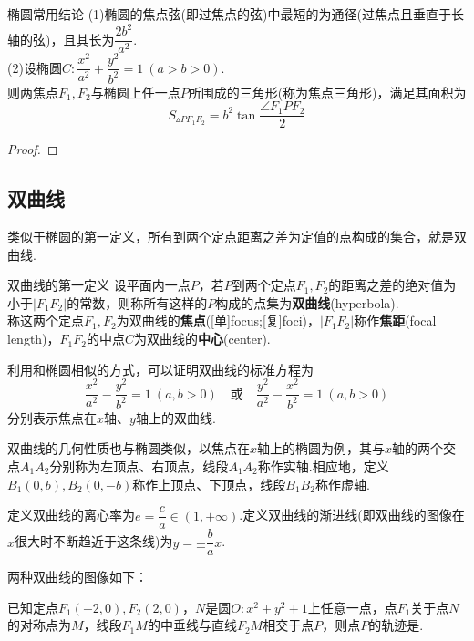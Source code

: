 \documentclass[lang=cn, zihao=5]{elegantbook}
\newcommand{\tk}{\uline{\hspace{4em}}}
\begin{document}
\begin{proposition}{椭圆常用结论}
	(1)椭圆的焦点弦(即过焦点的弦)中最短的为通径(过焦点且垂直于长轴的弦)，且其长为$\dfrac{2b^2}{a^2}$. \\
	(2)设椭圆$C:\dfrac{x^2}{a^2}+\dfrac{y^2}{b^2}=1~(a>b>0)$. \\
	则两焦点$F_1,F_2$与椭圆上任一点$P$所围成的三角形(称为焦点三角形)，满足其面积为$$S_{\vartriangle PF_1F_2} = b^2\tan \frac{\angle F_1PF_2}{2}$$
\end{proposition}
\begin{proof}
	
\end{proof}

\subsection{双曲线}

类似于椭圆的第一定义，所有到两个定点距离之差为定值的点构成的集合，就是双曲线.

\begin{definition}{双曲线的第一定义}
	设平面内一点$P$，若$P$到两个定点$F_1,F_2$的距离之差的绝对值为小于$|F_1F_2|$的常数，则称所有这样的$P$构成的点集为\textbf{双曲线}(hyperbola). \\
	称这两个定点$F_1,F_2$为双曲线的\textbf{焦点}([单]focus;[复]foci)，$|F_1F_2|$称作\textbf{焦距}(focal length)，$F_1F_2$的中点$C$为双曲线的\textbf{中心}(center).
\end{definition}

利用和椭圆相似的方式，可以证明双曲线的标准方程为$$\frac{x^2}{a^2}-\frac{y^2}{b^2}=1~(a,b>0) \quad \textit{或} \quad \frac{y^2}{a^2}-\frac{x^2}{b^2}=1~(a,b>0)$$
分别表示焦点在$x$轴、$y$轴上的双曲线.

双曲线的几何性质也与椭圆类似，以焦点在$x$轴上的椭圆为例，其与$x$轴的两个交点$A_1A_2$分别称为左顶点、右顶点，线段$A_1A_2$称作实轴.相应地，定义$B_1(0,b),B_2(0,-b)$称作上顶点、下顶点，线段$B_1B_2$称作虚轴.

定义双曲线的离心率为$e=\dfrac{c}{a} \in (1,+\infty)$.定义双曲线的渐进线(即双曲线的图像在$x$很大时不断趋近于这条线)为$y=\pm \dfrac{b}{a} x$.

两种双曲线的图像如下：


\begin{example}
	已知定点$F_1(-2,0),F_2(2,0)$，$N$是圆$O:x^2+y^2+1$上任意一点，点$F_1$关于点$N$的对称点为$M$，线段$F_1M$的中垂线与直线$F_2M$相交于点$P$，则点$P$的轨迹是\tk .
\end{example}
\end{document}
